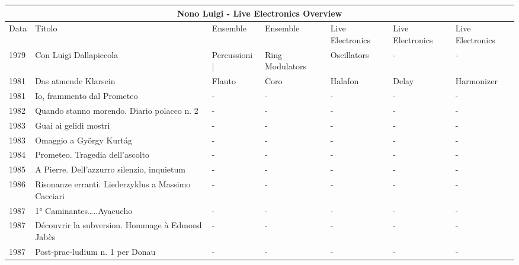 \documentclass{article}
\begin{document}
\begin{tabular}{ |p{3cm}|p{3cm}|p{3cm}|p{3cm}|p{3cm}|p{3cm}|p{3cm}|  }
\hline
\multicolumn{7}{|c|}{Nono Luigi - Live Electronics Overview} \\
\hline
Data& Titolo& Ensemble& Ensemble& Live Electronics &Live Electronics  &Live Electronics \\
\hline
1979 & Con Luigi Dallapiccola& Percussioni |  & Ring Modulators &Oscillators & - &- \\
1981 & Das atmende Klarsein &Flauto & Coro & Halafon &Delay &Harmonizer \\
1981 & Io, frammento dal Prometeo&-&-&-&-&- \\
1982 & Quando stanno morendo. Diario polacco n. 2&-&-&-&-&- \\
1983 &Guai ai gelidi mostri &-&-&-&-&- \\
1983 &Omaggio a György Kurtág &-&-&-&-&- \\
1984 &Prometeo. Tragedia dell’ascolto &-&-&-&-&- \\
1985 &A Pierre. Dell’azzurro silenzio, inquietum &-&-&-&-&- \\
1986 &Risonanze erranti. Liederzyklus a Massimo Cacciari &-&-&-&-&-\\
1987 &1° Caminantes…..Ayacucho&-&-&-&-&- \\
1987 &Découvrir la subversion. Hommage à Edmond Jabès &-&-&-&-&- \\
1987 &Post-prae-ludium n. 1 per Donau &-&-&-&-&- \\
\hline
\end{tabular}
\end{document}
